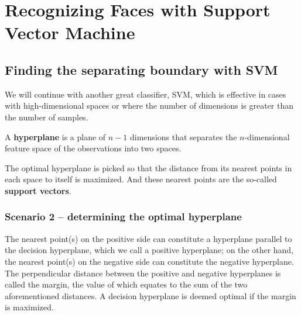 \chapter{Recognizing Faces with Support Vector Machine\label{Ch03}}
\section{Finding the separating boundary with SVM}
We will continue with another great classifier, SVM, which is effective in cases with high-dimensional spaces or where the number of dimensions is greater than the number of samples.

A \textbf{hyperplane} is a plane of $n - 1$ dimensions that separates the $n$-dimensional feature space of the observations into two spaces.

The optimal hyperplane is picked so that the distance from its nearest points in each space to itself is maximized. And these nearest points are the so-called \textbf{support vectors}.

\subsection{Scenario 2 – determining the optimal hyperplane}
The nearest point(s) on the positive side can constitute a hyperplane parallel to the decision hyperplane, which we call a positive hyperplane; on the other hand, the nearest point(s) on the negative side can constitute the negative hyperplane. The perpendicular distance between the positive and negative hyperplanes is called the margin, the value of which equates to the sum of the two aforementioned distances. A decision hyperplane is deemed optimal if the margin is maximized.